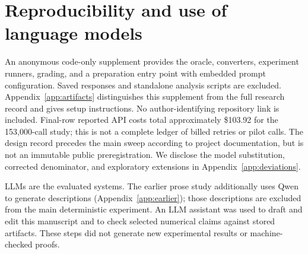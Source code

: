 \documentclass{article}
\begin{document}
\section*{Reproducibility and use of language models}

An anonymous code-only supplement provides the oracle, converters,
experiment runners, grading, and a preparation entry point with embedded prompt
configuration. Saved responses and standalone analysis scripts are excluded.
Appendix~\ref{app:artifacts} distinguishes this supplement from the full research
record and gives setup instructions. No author-identifying repository link is included.
Final-row reported API costs total approximately \$103.92 for the 153,000-call
study; this is not a complete ledger of billed retries or pilot calls.
The design record precedes the main sweep according to project documentation,
but is not an immutable public preregistration. We disclose the model
substitution, corrected denominator, and exploratory extensions in
Appendix~\ref{app:deviations}.

LLMs are the evaluated systems. The earlier prose study additionally uses Qwen
to generate descriptions (Appendix~\ref{app:earlier}); those descriptions are
excluded from the main deterministic experiment. An LLM assistant was used to
draft and edit this manuscript and to check selected numerical claims against
stored artifacts. These steps did not generate new experimental results or
machine-checked proofs.
\end{document}
